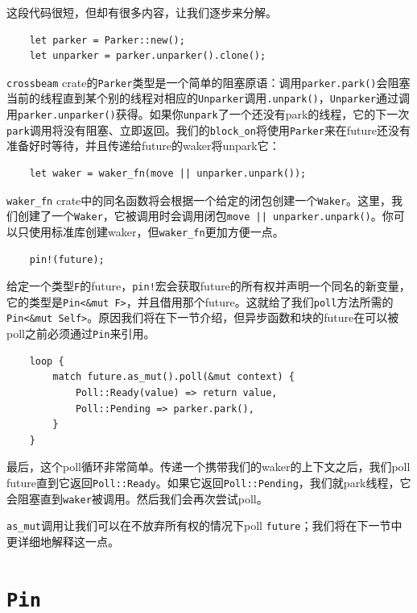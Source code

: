这段代码很短，但却有很多内容，让我们逐步来分解。

\begin{verbatim}
    let parker = Parker::new();
    let unparker = parker.unparker().clone();
\end{verbatim}

\texttt{crossbeam} crate的\texttt{Parker}类型是一个简单的阻塞原语：调用\texttt{parker.park()}会阻塞当前的线程直到某个别的线程对相应的\texttt{Unparker}调用\texttt{.unpark()}，\texttt{Unparker}通过调用\texttt{parker.unparker()}获得。如果你\texttt{unpark}了一个还没有park的线程，它的下一次\texttt{park}调用将没有阻塞、立即返回。我们的\texttt{block\_on}将使用\texttt{Parker}来在future还没有准备好时等待，并且传递给future的waker将unpark它：
\begin{verbatim}
    let waker = waker_fn(move || unparker.unpark());
\end{verbatim}

\texttt{waker\_fn} crate中的同名函数将会根据一个给定的闭包创建一个\texttt{Waker}。这里，我们创建了一个\texttt{Waker}，它被调用时会调用闭包\texttt{move || unparker.unpark()}。你可以只使用标准库创建waker，但\texttt{waker\_fn}更加方便一点。

\begin{verbatim}
    pin!(future);
\end{verbatim}
给定一个类型\texttt{F}的future，\texttt{pin!}宏会获取future的所有权并声明一个同名的新变量，它的类型是\texttt{Pin<\&mut F>}，并且借用那个future。这就给了我们\texttt{poll}方法所需的\texttt{Pin<\&mut Self>}。原因我们将在下一节介绍，但异步函数和块的future在可以被poll之前必须通过\texttt{Pin}来引用。

\begin{verbatim}
    loop {
        match future.as_mut().poll(&mut context) {
            Poll::Ready(value) => return value,
            Poll::Pending => parker.park(),
        }
    }
\end{verbatim}

最后，这个poll循环非常简单。传递一个携带我们的waker的上下文之后，我们poll future直到它返回\texttt{Poll::Ready}。如果它返回\texttt{Poll::Pending}，我们就park线程，它会阻塞直到\texttt{waker}被调用。然后我们会再次尝试poll。

\texttt{as\_mut}调用让我们可以在不放弃所有权的情况下poll \texttt{future}；我们将在下一节中更详细地解释这一点。

\section{\texttt{Pin}}


